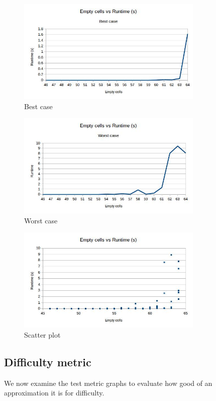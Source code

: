 \documentclass{article}
\begin{document}
\begin{figure}[H]
	\includegraphics[width=0.9\linewidth, height=5cm]{graphs_outputs/EmptycellsVSTimeBest.jpg}
	\caption{Best case}
\end{figure}

\begin{figure}[H]
	\includegraphics[width=0.9\linewidth, height=5cm]{graphs_outputs/EmptycellsVSTimeWorst.jpg}
	\caption{Worst case}
\end{figure}

\begin{figure}[H]
	\includegraphics[width=0.9\linewidth, height=5cm]{graphs_outputs/EmptycellsVSTimeScatter.jpg}
	\caption{Scatter plot}
\end{figure}

\newpage

\subsection{Difficulty metric}
We now examine the test metric graphs to evaluate how good of an approximation it is for difficulty.
\end{document}
